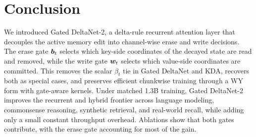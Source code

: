 \documentclass[10pt, logo, onecolumn, copyright]{nv}
\begin{document}
\section{Conclusion}
\label{sec_conclusion}

We introduced Gated DeltaNet-2, a delta-rule recurrent attention layer that decouples the active memory edit into channel-wise erase and write decisions. The erase gate ${\bm{b}}_t$ selects which key-side coordinates of the decayed state are read and removed, while the write gate ${\bm{w}}_t$ selects which value-side coordinates are committed. This removes the scalar $\beta_t$ tie in Gated DeltaNet and KDA, recovers both as special cases, and preserves efficient chunkwise training through a WY form with gate-aware kernels. Under matched 1.3B training, Gated DeltaNet-2 improves the recurrent and hybrid frontier across language modeling, commonsense reasoning, synthetic retrieval, and real-world recall, while adding only a small constant throughput overhead. Ablations show that both gates contribute, with the erase gate accounting for most of the gain.

\newpage
\appendix
\onecolumn



\clearpage



\newpage

{
  \small
  
  
}
\end{document}
